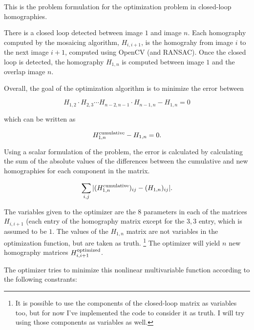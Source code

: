 \documentclass{article}
\begin{document}
 

This is the problem formulation for the optimization problem in closed-loop
homographies.

There is a closed loop detected between image $1$ and image $n$. Each
homography computed by the mosaicing algorithm, $H_{i, i + 1}$, is the
homograhy from image $i$ to the next image $i + 1$, computed using OpenCV (and
RANSAC). Once the closed loop is detected, the homography $H_{1, n}$ is
computed between image $1$ and the overlap image $n$. 

Overall, the goal of the optimization algorithm is to minimize the error
between
 
\[H_{1, 2} \cdot H_{2, 3} \cdots H_{n - 2, n - 1} \cdot H_{n - 1, n} - H_{1, n} = 0\]

which can be written as

\[H_{1, n}^{\textnormal{cumulative}} - H_{1, n} = 0.\]

Using a scalar formulation of the problem, the error is calculated by
calculating the sum of the absolute values of the differences between the
cumulative and new homographies for each component in the matrix.

\[\sum_{i,j} |(H_{1, n}^{\textnormal{cumulative}})_{ij} - (H_{1, n})_{ij}|.\]

The variables given to the optimizer are the $8$ parameters in each of the
matrices $H_{i, i + 1}$ (each entry of the homography matrix except for the $3,
3$ entry, which is assumed to be $1$. The values of the $H_{1, n}$ matrix are
not variables in the optimization function, but are taken as truth.
\footnote{It is possible to use the components of the closed-loop matrix as
variables too, but for now I've implemented the code to consider it as truth. I
will try using those components as variables as well.} The optimizer will yield
$n$ new homography matrices $H_{i, i+1}^{\textnormal{optimized}}$. 

The optimizer tries to minimize this nonlinear multivariable function according
to the following constrants:
\end{document}
